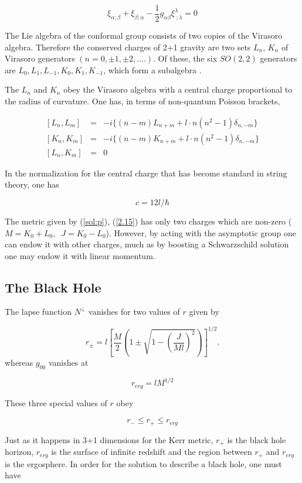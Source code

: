 \documentclass[12pt]{article}
\newcounter{c1} \newcounter{c2}
\newcommand{\bb}{\begin{equation}}
\newcommand{\ee}{\end{equation}}
\newcommand{\br}{\begin{eqnarray}}
\newcommand{\er}{\end{eqnarray}}
\begin{document}
\bb
\xi_{\alpha ;\beta} + \xi_{\beta ;\alpha} -\frac{1}{2} g_{\alpha
\beta} \xi^{\lambda}_{\; ;\lambda} = 0
\label{20}\ee

The Lie algebra of the conformal group consists of two copies of
the Virasoro algebra. Therefore the conserved charges of 2+1
gravity are two sets $L_n$, $K_n$ of Virasoro generators $(n =
0, \pm 1, \pm 2, ....)$. Of these, the six $SO(2,2)$ generators
are $ L_0, L_1, L_{-1}, K_0, K_1, K_{-1}$, which form a
subalgebra .

The $L_n$ and $K_n$ obey the Virasoro algebra with a central
charge proportional to the radius of curvature. One has, in
terms of non-quantum Poisson brackets,

\br
{[L_{n}, L_{m}]} &=& -i\{(n-m)L_{n+m} + l\cdot n(n^2-1)\delta_{n, -m} \}
\nonumber \\
{[K_{n}, K_{m}]} &=& -i\{(n-m)K_{n+m} + l\cdot n(n^2
-1)\delta_{n,-m} \}  \label{2.20.1} \\
{[L_{n}, K_{m}]} &=& 0  \nonumber
\er

In the normalization for the central charge that has become
standard in string theory, one has

\bb
c= 12l/\hbar
\label{2.20.2}
\ee

The metric given by (\ref{sol:p}), (\ref{2.15}) has only two
charges which are non-zero ($M =K_0 +L_0,\;\; J= K_0 -L_0$).
However, by acting with the asymptotic group one can endow it
with other charges, much as by boosting a Schwarzschild solution
one may endow it with linear momentum.


\subsection{The Black Hole}

The lapse function $N^{\perp}$ vanishes for two values of $r$
given by

\bb
r_{\pm}=l \left[ \frac{M}{2} \left( 1 \pm \sqrt{1-\left(
\frac{J}{Ml}\right)^2} \right) \right]^{1/2}.
\label{21}
\ee
%
whereas $g_{00}$ vanishes at

\bb
r_{erg} = l M^{1/2}
\label{22}
\ee

These three special values of $r$ obey

\bb
r_{-} \leq r_{+} \leq r_{erg}
\label{23}
\ee

Just as it happens in 3+1 dimensions for the Kerr metric, $r_{+}$
is the black hole horizon, $r_{erg}$ is the surface of infinite
redshift and the region between $r_{+}$ and $r_{erg}$ is the
ergosphere. In order for the solution to describe a black hole,
one must have
\end{document}
